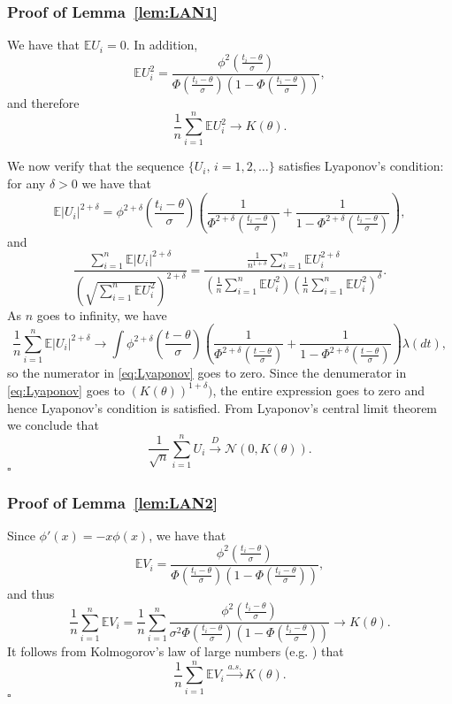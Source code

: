 \documentclass[letterpaper, conference]{IEEEtran}      %
\newcommand*{\QEDA}{\hfill\ensuremath{\square}}
\begin{document}
\subsubsection*{Proof of Lemma~\ref{lem:LAN1}} 
We have that $\mathbb E  U_i= 0$. In addition,
\[
\mathbb E U_i^2 = \frac{ \phi^2 \left( \frac{t_i-\theta}{\sigma} \right) } { \Phi \left( \frac{t_i-\theta}{\sigma} \right) \left(1- \Phi \left( \frac{t_i-\theta}{\sigma} \right) \right)},
\]
and therefore
\[
\frac{1}{n} \sum_{i=1}^n \mathbb E U_i^2 \rightarrow K(\theta).
\]

We now verify that the sequence $\{ U_i,\,i=1,2,\ldots \}$ satisfies Lyaponov's condition: for any $\delta>0$ we have that 
\[
\mathbb E \left| U_i \right|^{2+\delta} = \phi^{2+\delta} \left(\frac{t_i-\theta} {\sigma } \right)   \left( \frac{1}{\Phi^{2+\delta} \left(\frac{t_i-\theta}{\sigma }\right)} + \frac{1}{1-\Phi^{2+\delta} \left(\frac{t_i-\theta}{\sigma }\right)} \right),
\]
and
\begin{equation}
\frac{\sum_{i=1}^n \mathbb E \left| U_i \right|^{2+\delta} }{ \left( \sqrt{\sum_{i=1}^n \mathbb E U_i^2 } \right)^{2+\delta}} = 
\frac{ \frac{1}{n^{1+\delta}} \sum_{i=1}^n \mathbb E U_i^{2+\delta} }{ \left(\frac{1}{n} \sum_{i=1}^n \mathbb E U_i^2  \right) \left(\frac{1}{n} \sum_{i=1}^n \mathbb E U_i^2  \right)^\delta}. 
\label{eq:Lyaponov}
\end{equation}
As $n$ goes to infinity, we have
\[
\frac{1}{n}\sum_{i=1}^n \mathbb E \left| U_i \right|^{2+\delta}  \rightarrow \int \phi^{2+\delta} \left(\frac{t-\theta}{\sigma }\right) \left( \frac{1}{\Phi^{2+\delta}\left(\frac{t-\theta}{\sigma }\right)} + \frac{1}{1-\Phi^{2+\delta} \left(\frac{t-\theta}{\sigma }\right)} \right) \lambda(dt),
\]
so the numerator in \eqref{eq:Lyaponov} goes to zero. Since the denumerator in \eqref{eq:Lyaponov} goes to $(K(\theta))^{1+\delta})$, the entire expression goes to zero and hence Lyaponov's condition is satisfied. From Lyaponov's central limit theorem we conclude that 
\[
\frac{1}{\sqrt{n}} \sum_{i=1}^n U_i \overset{D}{\rightarrow} \mathcal N\left(0,K(\theta) \right). 
\]
\QEDA

\subsubsection*{Proof of Lemma~\ref{lem:LAN2}} 

Since $\phi'(x) = -x \phi(x)$, we have that
\[
\mathbb E V_i =  \frac{\phi^2 \left(\frac{ t_i-\theta}{\sigma} \right) } { \Phi \left(\frac{ t_i-\theta}{\sigma} \right)  \left(1-\Phi \left(\frac{ t_i-\theta}{\sigma} \right)  \right)},
\]
and thus
\[
\frac{1}{n} \sum_{i=1}^n \mathbb E V_i =  \frac{1}{n} \sum_{i=1}^n  \frac{\phi^2\left( \frac{t_i-\theta}{\sigma} \right)} {\sigma^2 \Phi \left( \frac{t_i - \theta}{\sigma} \right)\left(1-\Phi \left( \frac{t_i - \theta}{\sigma} \right) \right)} \rightarrow K(\theta).  
\]
It follows from Kolmogorov's law of large numbers (e.g. \cite[Thm. 10.2.3]{sen1994large}) that
\[
\frac{1}{n} \sum_{i=1}^n \mathbb E V_i \overset{a.s.}{\rightarrow} K(\theta). 
\]
\QEDA
\end{document}

